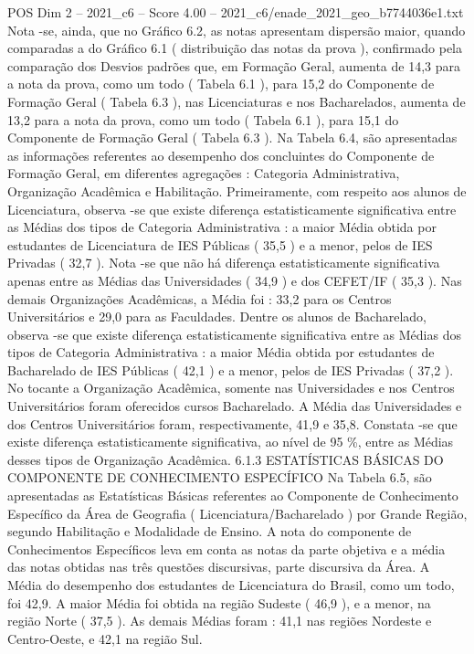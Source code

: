 \begin{textsample}{POS Dim 2 – 2021\_c6 – Score 4.00 – 2021\_c6/enade\_2021\_geo\_b7744036e1.txt}
Nota -se, ainda, que no Gráfico 6.2, as notas apresentam dispersão maior, quando comparadas a do Gráfico 6.1 ( distribuição das notas da prova ), confirmado pela comparação dos Desvios padrões que, em Formação Geral, aumenta de 14,3 para a nota da prova, como um todo ( Tabela 6.1 ), para 15,2 do Componente de Formação Geral ( Tabela 6.3 ), nas Licenciaturas e nos Bacharelados, aumenta de 13,2 para a nota da prova, como um todo ( Tabela 6.1 ), para 15,1 do Componente de Formação Geral ( Tabela 6.3 ).
Na Tabela 6.4, são apresentadas as informações referentes ao desempenho dos concluintes do Componente de Formação Geral, em diferentes agregações : Categoria Administrativa, Organização Acadêmica e Habilitação.
Primeiramente, com respeito aos alunos de Licenciatura, observa -se que existe diferença estatisticamente significativa entre as Médias dos tipos de Categoria Administrativa : a maior Média obtida por estudantes de Licenciatura de IES Públicas ( 35,5 ) e a menor, pelos de IES Privadas ( 32,7 ).
Nota -se que não há diferença estatisticamente significativa apenas entre as Médias das Universidades ( 34,9 ) e dos CEFET/IF ( 35,3 ).
Nas demais Organizações Acadêmicas, a Média foi : 33,2 para os Centros Universitários e 29,0 para as Faculdades.
Dentre os alunos de Bacharelado, observa -se que existe diferença estatisticamente significativa entre as Médias dos tipos de Categoria Administrativa : a maior Média obtida por estudantes de Bacharelado de IES Públicas ( 42,1 ) e a menor, pelos de IES Privadas ( 37,2 ).
No tocante a Organização Acadêmica, somente nas Universidades e nos Centros Universitários foram oferecidos cursos Bacharelado.
A Média das Universidades e dos Centros Universitários foram, respectivamente, 41,9 e 35,8.
Constata -se que existe diferença estatisticamente significativa, ao nível de 95 \%, entre as Médias desses tipos de Organização Acadêmica. 6.1.3 ESTATÍSTICAS BÁSICAS DO COMPONENTE DE CONHECIMENTO ESPECÍFICO Na Tabela 6.5, são apresentadas as Estatísticas Básicas referentes ao Componente de Conhecimento Específico da Área de Geografia ( Licenciatura/Bacharelado ) por Grande Região, segundo Habilitação e Modalidade de Ensino.
A nota do componente de Conhecimentos Específicos leva em conta as notas da parte objetiva e a média das notas obtidas nas três questões discursivas, parte discursiva da Área.
A Média do desempenho dos estudantes de Licenciatura do Brasil, como um todo, foi 42,9.
A maior Média foi obtida na região Sudeste ( 46,9 ), e a menor, na região Norte ( 37,5 ).
As demais Médias foram : 41,1 nas regiões Nordeste e Centro-Oeste, e 42,1 na região Sul.

\end{textsample}
